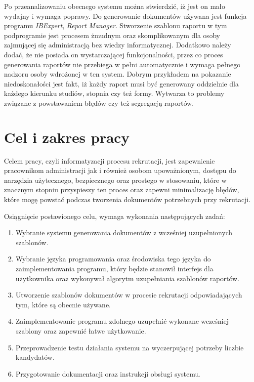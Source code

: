 Po przeanalizowaniu obecnego systemu można stwierdzić, iż jest on mało wydajny i wymaga poprawy. Do generowanie dokumentów używana jest funkcja programu \emph{IBExpert}, \emph{Report Manager}. Stworzenie szablonu raportu w tym podprogramie jest procesem żmudnym oraz skomplikowanym dla osoby zajmującej się administracją bez wiedzy informatycznej. Dodatkowo należy dodać, że nie posiada on wystarczającej funkcjonalności, przez co proces generowania raportów nie przebiega w pełni automatycznie i wymaga pełnego nadzoru osoby wdrożonej w ten system.  Dobrym przykładem na pokazanie niedoskonałości jest fakt, iż każdy raport musi być generowany oddzielnie dla każdego kierunku studiów, stopnia czy też formy. Wytwarza to problemy związane z powstawaniem błędów czy też segregacją raportów.

\section{Cel i zakres pracy}

Celem pracy, czyli informatyzacji procesu rekrutacji, jest zapewnienie pracownikom administracji jak i również osobom upoważnionym, dostępu do narzędzia użytecznego, bezpiecznego oraz prostego w stosowaniu, które w znacznym stopniu przyspieszy ten proces oraz zapewni minimalizację błędów, które mogę powstać podczas tworzenia dokumentów potrzebnych przy rekrutacji. 
\par
\vspace{10mm}
Osiągnięcie postawionego celu, wymaga wykonania następujących zadań:
\vspace{5mm}
\begin{enumerate}
\item Wybranie systemu generowania dokumentów z wcześniej uzupełnionych szablonów.\vspace{5mm}
\item Wybranie języka programowania oraz środowiska tego języka do zaimplementowania programu, który będzie stanowił interfejs dla użytkownika oraz wykonywał algorytm uzupełniania szablonów raportów.\vspace{5mm}
\item Utworzenie szablonów dokumentów w procesie rekrutacji odpowiadających tym, które są obecnie używane.\vspace{5mm}
\item Zaimplementowanie programu zdolnego uzupełnić wykonane wcześniej szablony oraz zapewnić łatwe użytkowanie.\vspace{5mm}
\item Przeprowadzenie testu działania systemu na wyczerpującej potrzeby liczbie kandydatów.\vspace{5mm}
\item Przygotowanie dokumentacji oraz instrukcji obsługi systemu.\vspace{5mm}
\end{enumerate}
